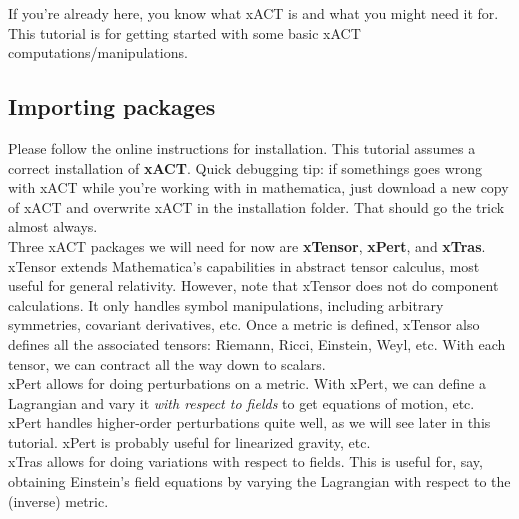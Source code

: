 \documentclass{book}
\theoremstyle{definition}
\begin{document}
If you're already here, you know what xACT is and what you might need it for. This tutorial is for getting started with some basic xACT computations/manipulations.



\subsection{Importing packages}

Please follow the online instructions for installation. This tutorial assumes a correct installation of \textbf{xACT}. Quick debugging tip: if somethings goes wrong with xACT while you're working with in mathematica, just download a new copy of xACT and overwrite xACT in the installation folder. That should go the trick almost always.\\

Three xACT packages we will need for now are \textbf{xTensor}, \textbf{xPert}, and \textbf{xTras}. xTensor extends Mathematica's capabilities in abstract tensor calculus, most useful for general relativity. However, note that xTensor does not do component calculations. It only handles symbol manipulations, including arbitrary symmetries, covariant derivatives, etc. Once a metric is defined, xTensor also defines all the associated tensors: Riemann, Ricci, Einstein, Weyl, etc. With each tensor, we can contract all the way down to scalars. \\

xPert allows for doing perturbations on a metric. With xPert, we can define a Lagrangian and vary it \textit{with respect to fields} to get equations of motion, etc. xPert handles higher-order perturbations quite well, as we will see later in this tutorial. xPert is probably useful for linearized gravity, etc.\\

xTras allows for doing variations with respect to fields. This is useful for, say, obtaining Einstein's field equations by varying the Lagrangian with respect to the (inverse) metric. \\
\end{document}
